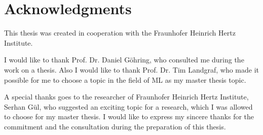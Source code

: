\chapter*{Acknowledgments}
This thesis was created in cooperation with the Fraunhofer Heinrich Hertz Institute.

I would like to thank Prof. Dr. Daniel Göhring, who consulted me during the work on a thesis. Also I would like to thank Prof. Dr. Tim Landgraf, who made it possible for me to choose a topic in the field of ML as my master thesis topic.

A special thanks goes to the researcher of Fraunhofer Heinrich Hertz Institute, Serhan Gül, who suggested an exciting topic for a research, which I was allowed to choose for my master thesis. I would like to express my sincere thanks for the commitment and the consultation during the preparation of this thesis.

